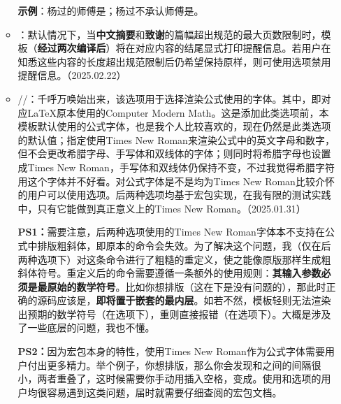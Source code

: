 \documentclass[print, doctor, vlined]{DissertUESTC}
\begin{document}
\begin{itemize}
\begin{itemize}
			\textbf{示例}：杨过的师傅是；杨过不承认师傅是。
			
			\item {}：默认情况下，当\textbf{中文摘要}和\textbf{致谢}的篇幅超出规范的最大页数限制时，模板（\textbf{经过两次编译后}）将在对应内容的结尾显式打印提醒信息。若用户在知悉这些内容的长度超出规范限制后仍希望保持原样，则可使用选项禁用提醒信息。（2025.02.22）
			
			\item {}//：千呼万唤始出来，该选项用于选择渲染公式使用的字体。其中，即对应LaTeX原本使用的Computer Modern Math。这是添加此类选项前，本模板默认使用的公式字体，也是我个人比较喜欢的，现在仍然是此类选项的默认值；指定使用Times New Roman来渲染公式中的英文字母和数字，但不会更改希腊字母、手写体和双线体的字体；则同时将希腊字母也设置成Times New Roman，手写体和双线体仍保持不变，不过我觉得希腊字符用这个字体并不好看。对公式字体是不是均为Times New Roman比较介怀的用户可以使用选项。后两种选项均基于\href{https://mirrors.nju.edu.cn/CTAN/macros/xetex/latex/mathspec/mathspec.pdf}{}宏包实现，在我有限的测试实践中，只有它能做到真正意义上的Times New Roman。（2025.01.31）
			
			\textbf{PS1：}需要注意，后两种选项使用的Times New Roman字体本不支持在公式中排版粗斜体，即原本的命令会失效。为了解决这个问题，我（仅在后两种选项下）对这条命令进行了粗糙的重定义，使之能像原版那样生成粗斜体符号。重定义后的命令需要遵循一条额外的使用规则：\textbf{其输入参数必须是最原始的数学符号}。比如你想排版（这在下是没有问题的），那此时正确的源码应该是，\textbf{即将置于嵌套的最内层}。如若不然，模板轻则无法渲染出预期的数学符号（在选项下），重则直接报错（在选项下）。大概是涉及了一些底层的问题，我也不懂。

			\textbf{PS2：}因为\href{https://mirrors.nju.edu.cn/CTAN/macros/xetex/latex/mathspec/mathspec.pdf}{}宏包本身的特性，使用Times New Roman作为公式字体需要用户付出更多精力。举个例子，你想排版，那么你会发现和之间的间隔很小，两者重叠了，这时候需要你手动用插入空格，变成。使用和选项的用户均很容易遇到这类问题，届时就需要仔细查阅\href{https://mirrors.nju.edu.cn/CTAN/macros/xetex/latex/mathspec/mathspec.pdf}{}的宏包文档。


\end{itemize}
\end{itemize}
\end{document}
